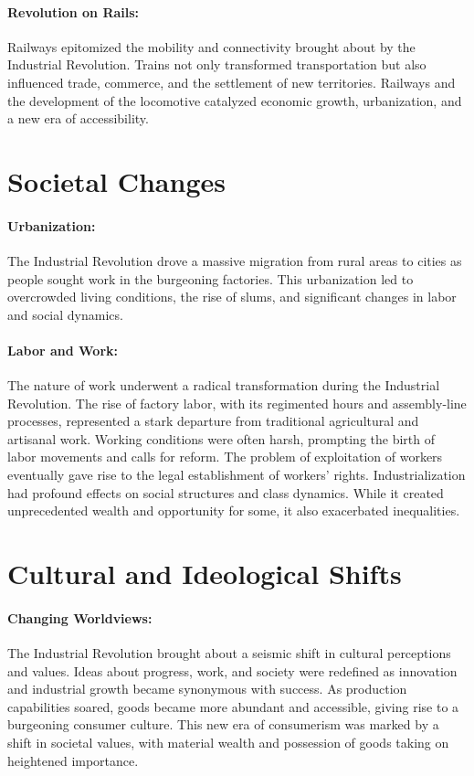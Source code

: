 \documentclass{book}
\begin{document}
\paragraph{Revolution on Rails:}
Railways epitomized the mobility and connectivity brought about by the Industrial Revolution. Trains not only transformed transportation but also influenced trade, commerce, and the settlement of new territories. Railways and the development of the locomotive catalyzed economic growth, urbanization, and a new era of accessibility.

\section*{Societal Changes}

\paragraph{Urbanization:}
The Industrial Revolution drove a massive migration from rural areas to cities as people sought work in the burgeoning factories. This urbanization led to overcrowded living conditions, the rise of slums, and significant changes in labor and social dynamics. 

\paragraph{Labor and Work:}
The nature of work underwent a radical transformation during the Industrial Revolution. The rise of factory labor, with its regimented hours and assembly-line processes, represented a stark departure from traditional agricultural and artisanal work. Working conditions were often harsh, prompting the birth of labor movements and calls for reform. The problem of exploitation of workers eventually gave rise to the legal establishment of workers’ rights. Industrialization had profound effects on social structures and class dynamics. While it created unprecedented wealth and opportunity for some, it also exacerbated inequalities. 

\section*{Cultural and Ideological Shifts}

\paragraph{Changing Worldviews:}
The Industrial Revolution brought about a seismic shift in cultural perceptions and values. Ideas about progress, work, and society were redefined as innovation and industrial growth became synonymous with success. As production capabilities soared, goods became more abundant and accessible, giving rise to a burgeoning consumer culture. This new era of consumerism was marked by a shift in societal values, with material wealth and possession of goods taking on heightened importance. 
\end{document}
